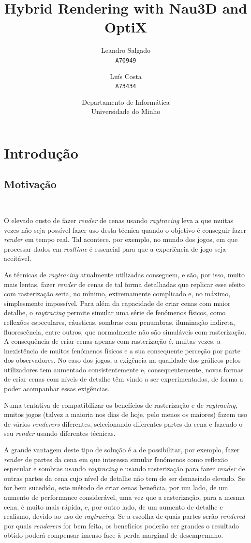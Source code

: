 \documentclass[10pt]{article}
\title{Hybrid Rendering with Nau3D and OptiX}
\author{
    Leandro Salgado\\
    \texttt{A70949}
    \and
    Luís Costa\\
    \texttt{A73434}
}
\date{Departamento de Informática\\Universidade do Minho}
\begin{document}
\maketitle

\newpage

\section{Introdução} \label{sec:int}


\subsection{Motivação}~

O elevado custo de fazer \textit{render} de cenas usando \textit{raytracing} leva a que muitas vezes não seja possível fazer uso desta técnica quando o objetivo é conseguir fazer \textit{render} em tempo real. Tal acontece, por exemplo, no mundo dos jogos, em que processar dados em \textit{realtime} é essencial para que a experiência de jogo seja aceitável.

As técnicas de \textit{raytracing} atualmente utilizadas conseguem, e são, por isso, muito mais lentas, fazer \textit{render} de cenas de tal forma detalhadas que replicar esse efeito com rasterização seria, no mínimo, extremamente complicado e, no máximo, simplesmente impossível. Para além da capacidade de criar cenas com maior detalhe, o \textit{raytracing} permite simular uma série de fenómenos físicos, como reflexões especulares, cáusticas, sombras com penumbras, iluminação indireta, fluorescência, entre outros, que normalmente não são simuláveis com rasterização. A consequência de criar cenas apenas com rasterização é, muitas vezes, a inexistência de muitos fenómenos físicos e a sua consequente perceção por parte dos observadores. No caso dos jogos, a exigência na qualidade dos gráficos pelos utilizadores tem aumentado consistentemente e, consequentemente, novas formas de criar cenas com níveis de detalhe têm vindo a ser experimentadas, de forma a poder acompanhar essas exigências.

Numa tentativa de compatibilizar os benefícios de rasterização e de \textit{raytracing}, muitos jogos (talvez a maioria nos dias de hoje, pelo menos os maiores) fazem uso de vários \textit{renderers} diferentes, selecionando diferentes partes da cena e fazendo o seu \textit{render} usando diferentes técnicas.

A grande vantagem deste tipo de solução é a de possibilitar, por exemplo, fazer \textit{render} de partes da cena em que interessa simular fenómenos como reflexão especular e sombras usando \textit{raytracing} e usando rasterização para fazer \textit{render} de outras partes da cena cujo nível de detalhe não tem de ser demasiado elevado. Se for bem sucedido, este método de criar cenas beneficia, por um lado, de um aumento de performance considerável, uma vez que a rasterização, para a mesma cena, é muito mais rápida, e, por outro lado, de um aumento de detalhe e realismo, devido ao uso de \textit{raytracing}. Se a escolha de quais partes serão \textit{rendered} por quais \textit{renderers} for bem feita, os benefícios poderão ser grandes o resultado obtido poderá compensar imenso face à perda marginal de desempemnho.
\end{document}
